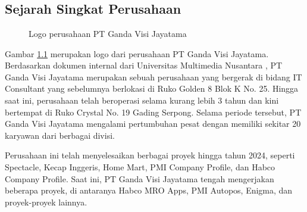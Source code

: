 \chapter{\babDua}

\section{Sejarah Singkat Perusahaan}

\begin{figure}[H]
    \centering
    \caption{Logo perusahaan PT Ganda Visi Jayatama}
    \label{concise-logo}
\end{figure}

Gambar \ref{concise-logo} merupakan logo dari perusahaan PT Ganda Visi Jayatama. Berdasarkan dokumen internal dari Universitas Multimedia Nusantara \cite{umn2023}, 
PT Ganda Visi Jayatama merupakan sebuah perusahaan yang bergerak di bidang IT Consultant 
yang sebelumnya berlokasi di Ruko Golden 8 Blok K No. 25. Hingga saat ini, perusahaan 
telah beroperasi selama kurang lebih 3 tahun dan kini bertempat di Ruko Crystal No. 19 
Gading Serpong. Selama periode tersebut, PT Ganda Visi Jayatama mengalami pertumbuhan 
pesat dengan memiliki sekitar 20 karyawan dari berbagai divisi. 

Perusahaan ini telah menyelesaikan berbagai proyek hingga tahun 2024, seperti 
Spectacle, Kecap Inggeris, Home Mart, PMI Company Profile, dan Habco Company 
Profile. Saat ini, PT Ganda Visi Jayatama tengah mengerjakan beberapa proyek, di 
antaranya Habco MRO Apps, PMI Autopos, Enigma, dan proyek-proyek lainnya.



